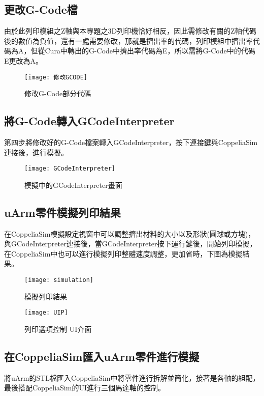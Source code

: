 \subsection{更改G-Code檔}
 由於此列印模組之Z軸與本專題之3D列印機恰好相反，因此需修改有關的Z軸代碼後的數值為負值，還有一處需要修改，那就是擠出率的代碼，列印模組中擠出率代碼為A，但從Cura中轉出的G-Code中擠出率代碼為E，所以需將G-Code中的代碼E更改為A。
\begin{figure}[hbt!]
\begin{center}
\texttt{[image: 修改GCODE]}
\caption{\Large 修改G-Code部分代碼}\label{修改GCODE}
\end{center}
\end{figure}
\subsection{將G-Code轉入GCodeInterpreter}
 第四步將修改好的G-Code檔案轉入GCodeInterpreter，按下連接鍵與CoppeliaSim連接後，進行模擬。\\
\begin{figure}[hbt!]
\begin{center}
\texttt{[image: GCodeInterpreter]}
\caption{\Large 模擬中的GCodeInterpreter畫面}\label{GCodeInterpreter}
\end{center}
\end{figure}
\subsection{uArm零件模擬列印結果}
 在CoppeliaSim模擬設定視窗中可以調整擠出材料的大小以及形狀(圓球或方塊)，與GCodeInterpreter連接後，當GCodeInterpreter按下運行鍵後，開始列印模擬，在CoppeliaSim中也可以進行模擬列印整體速度調整，更加省時，下圖為模擬結果。\\
\begin{figure}[hbt!]
\begin{center}
\texttt{[image: simulation]}
\caption{\Large 模擬列印結果}\label{simulation}
\end{center}
\end{figure}

\begin{figure}[hbt!]
\begin{center}
\texttt{[image: UIP]}
\caption{\Large 列印選項控制 UI介面}\label{UIP}
\end{center}
\end{figure}

\subsection{在CoppeliaSim匯入uArm零件進行模擬}
 將uArm的STL檔匯入CoppeliaSim中將零件進行拆解並簡化，接著是各軸的組配，最後搭配CoppeliaSim的UI進行三個馬達軸的控制。\\
 
